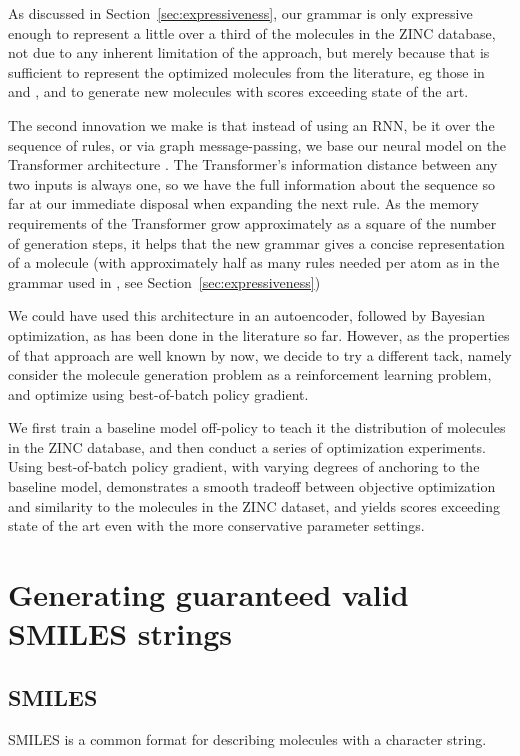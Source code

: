 \documentclass[11pt]{article}
\begin{document}
As discussed in Section~\ref{sec:expressiveness}, our grammar is only expressive enough to represent a little over a third of the molecules in the ZINC database, not due to any inherent limitation of the approach, but merely because that is sufficient to represent the optimized molecules from the literature, eg those in \cite{kusner17} and \cite{jin18}, and to generate new molecules with scores exceeding state of the art. 
 
The second innovation we make is that instead of using an RNN, be it over the sequence of rules, or via graph message-passing, we base our neural model on the Transformer architecture \cite{Transformer17}. The Transformer's information distance between any two inputs is always one, so we have the full information about the sequence so far at our immediate disposal when expanding the next rule. As the memory requirements of the Transformer grow approximately as a square of the number of generation steps, it helps that the new grammar gives a concise representation of a molecule (with approximately half as many rules needed per atom as in the grammar used in \cite{kusner17}, see Section~\ref{sec:expressiveness})
 
 We could have used this architecture in an autoencoder, followed by Bayesian optimization, as has been done in the literature so far. However, as the properties of that approach are well known by now, we decide to try a different tack, namely consider the molecule generation problem as a reinforcement learning problem, and optimize using best-of-batch policy gradient. 
 
 We first train a baseline model off-policy to teach it the distribution of molecules in the ZINC database, and then conduct a series of optimization experiments. Using best-of-batch policy gradient, with varying degrees of anchoring to the baseline model, demonstrates a smooth tradeoff between objective optimization and similarity to the molecules in the ZINC dataset, and yields scores exceeding state of the art even with the more conservative parameter settings.

\section{Generating guaranteed valid SMILES strings}\label{sec:valid_smiles}
\subsection{SMILES}
SMILES \cite{Weininger88} is a common format for describing molecules with a character string.
 
\end{document}
